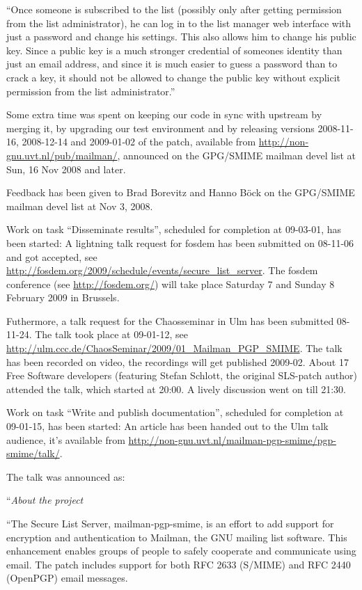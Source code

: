 \documentclass[a4]{article}
\begin{document}
``Once someone is subscribed to the list (possibly only after getting permission
from the list administrator), he can log in to the list manager web interface
with just a password and change his settings. This also allows him to change
his public key. Since a public key is a much stronger credential of someones
identity than just an email address, and since it is much easier to guess a
password than to crack a key, it should not be allowed to change the public key
without explicit permission from the list administrator.''

Some extra time was spent on keeping our code in sync with upstream by merging
it, by upgrading our test environment and by releasing versions 2008-11-16,
2008-12-14 and 2009-01-02 of the patch, available from
\url{http://non-gnu.uvt.nl/pub/mailman/}, announced on the GPG/SMIME mailman
devel list at Sun, 16 Nov 2008 and later.

Feedback has been given to Brad Borevitz and Hanno B\"{o}ck on the GPG/SMIME
mailman devel list at Nov 3, 2008.

Work on task ``Disseminate results'', scheduled for completion at 09-03-01, has
been started:  A lightning talk request for fosdem has been submitted on
08-11-06 and got accepted, see
\url{http://fosdem.org/2009/schedule/events/secure_list_server}.  The fosdem
conference (see \url{http://fosdem.org/}) will take place Saturday 7 and Sunday
8 February 2009 in Brussels.

Futhermore, a talk request for the Chaosseminar in Ulm has been submitted
08-11-24.  The talk took place at 09-01-12, see
\url{http://ulm.ccc.de/ChaosSeminar/2009/01_Mailman_PGP_SMIME}.  The talk has
been recorded on video, the recordings will get published 2009-02.  About 17
Free Software developers (featuring Stefan Schlott, the original SLS-patch
author) attended the talk, which started at 20:00.  A lively discussion went on
till 21:30.

Work on task ``Write and publish documentation'', scheduled for completion at
09-01-15, has been started: An article has been handed out to the Ulm talk
audience, it's available from
\url{http://non-gnu.uvt.nl/mailman-pgp-smime/pgp-smime/talk/}.

The talk was announced as:

``\textit{About the project}

``The Secure List Server, mailman-pgp-smime, is an effort to add support for
encryption and authentication to Mailman, the GNU mailing list software.  This
enhancement enables groups of people to safely cooperate and communicate using
email.  The patch includes support for both RFC 2633 (S/MIME) and RFC 2440
(OpenPGP) email messages.
\end{document}
